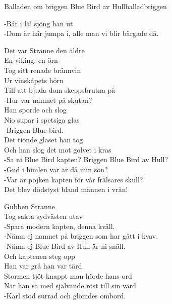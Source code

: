\begin{song}{Balladen om briggen Blue Bird av Hull}{balladbriggen}
\begin{vers}
-Båt i lä! sjöng han ut\\
-Dom är här jumpa i, alle man vi blir bärgade då.\\
\end{vers}
\begin{vers}
Det var Stranne den äldre\\
En viking, en örn\\
Tog sitt renade brännvin\\
Ur vinskåpets hörn\\
Till att bjuda dom skeppsbrutna på\\
-Hur var namnet på skutan?\\
Han sporde och slog\\
Nio supar i spetsiga glas\\
-Briggen Blue bird.\\
Det tionde glaset han tog\\
Och han slog det mot golvet i kras\\
-Sa ni Blue Bird kapten? Briggen Blue Bird av Hull?\\
-Gud i himlen var är då min son?\\
-Var är pojken kapten för vår frälsares skull?\\
Det blev dödstyst bland männen i vrån!\\
\end{vers}
\begin{vers}
Gubben Stranne\\
Tog sakta sydvästen utav\\
-Spara modern kapten, denna kväll.\\
-Nämn ej namnet på briggen som har gått i kvav.\\
-Nämn ej Blue Bird av Hull är ni snäll.\\
Och kaptenen steg opp\\
Han var grå han var tärd\\
Stormen tjöt knappt man hörde hans ord\\
När han sa med självande röst till sin värd\\
-Karl stod surrad och glömdes ombord.\\
\end{vers}
\end{song}
